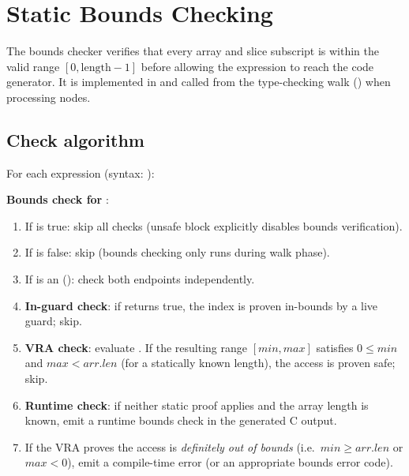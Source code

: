 \chapter{Static Bounds Checking}
\label{chap:15-bounds}

\pnum
The bounds checker verifies that every array and slice subscript is within the
valid range $[0, \text{length}-1]$ before allowing the expression to reach the
code generator.  It is implemented in  and called from
the type-checking walk () when processing
 nodes.

\section{Check algorithm}
\label{sec:bounds-algo}

\pnum
For each  expression (syntax: ):

\begin{algorithm}
\textbf{Bounds check for }:
\begin{enumerate}
\item If  is true: skip all checks (unsafe block
  explicitly disables bounds verification).
\item If  is false: skip (bounds checking only runs
  during walk phase).
\item If  is an  (): check both
  endpoints independently.
\item \textbf{In-guard check}: if  returns
  true, the index is proven in-bounds by a live  guard; skip.
\item \textbf{VRA check}: evaluate .
  If the resulting range $[min, max]$ satisfies $0 \leq min$ and $max < arr.len$
  (for a statically known length), the access is proven safe; skip.
\item \textbf{Runtime check}: if neither static proof applies and the array length
  is known, emit a runtime bounds check in the generated C output.
\item If the VRA proves the access is \emph{definitely out of bounds} (i.e.\
  $min \geq arr.len$ or $max < 0$), emit a compile-time error 
  (or an appropriate bounds error code).
\end{enumerate}
\end{algorithm}

